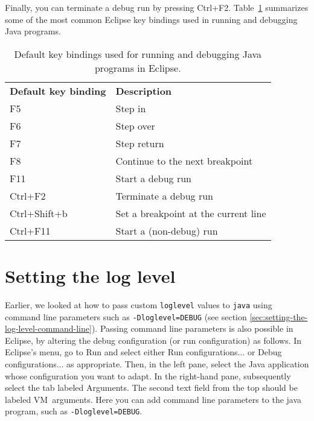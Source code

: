 Finally, you can terminate a debug run by pressing \textsf{Ctrl+F2}. Table~\ref{tab:key-bindings-eclipse} summarizes some of the most common Eclipse key bindings used in running and debugging Java programs.


\begin{table}[!ht]
\vspace{1.0em}
\caption{Default key bindings used for running and debugging Java programs in Eclipse.\label{tab:key-bindings-eclipse}}
\begin{tabular}{lp{10cm}}
\vspace{0.5em}
\textbf{Default key binding} & \textbf{Description}                  \\
\textsf{F5}                  & Step in                               \\
\textsf{F6}                  & Step over                             \\
\textsf{F7}                  & Step return                           \\
\textsf{F8}                  & Continue to the next breakpoint       \\
\textsf{F11}                 & Start a debug run                     \\
\textsf{Ctrl+F2}             & Terminate a debug run                 \\
\textsf{Ctrl+Shift+b}        & Set a breakpoint at the current line  \\
\textsf{Ctrl+F11}            & Start a (non-debug) run               \\
\end{tabular}
\end{table}

\section{Setting the log level}

Earlier, we looked at how to pass custom \texttt{loglevel} values to \texttt{java} using command line parameters such as \texttt{-Dloglevel=DEBUG} (see section \ref{sec:setting-the-log-level-command-line}). Passing command line parameters is also possible in Eclipse, by altering the debug configuration (or run configuration) as follows. In Eclipse's menu, go to \textsf{Run} and select either \textsf{Run configurations...} or \textsf{Debug configurations...} as appropriate. Then, in the left pane, select the Java application whose configuration you want to adapt. In the right-hand pane, subsequently select the tab labeled \textsf{Arguments}. The second text field from the top should be labeled \textsf{VM~arguments}. Here you can add command line parameters to the java program, such as \texttt{-Dloglevel=DEBUG}.
